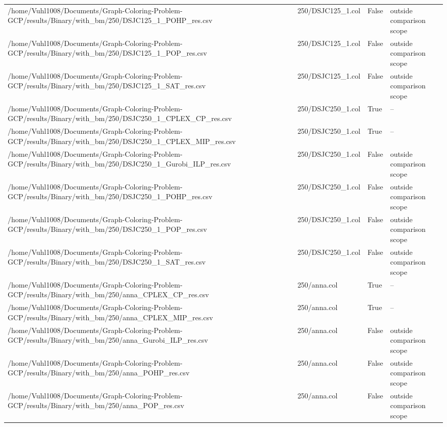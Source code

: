 \begin{table}[htbp]
\begin{tabular}{llll}
/home/Vuhl1008/Documents/Graph-Coloring-Problem-GCP/results/Binary/with\_bm/250/DSJC125\_1\_POHP\_res.csv & 250/DSJC125\_1.col & False & outside comparison scope \\
/home/Vuhl1008/Documents/Graph-Coloring-Problem-GCP/results/Binary/with\_bm/250/DSJC125\_1\_POP\_res.csv & 250/DSJC125\_1.col & False & outside comparison scope \\
/home/Vuhl1008/Documents/Graph-Coloring-Problem-GCP/results/Binary/with\_bm/250/DSJC125\_1\_SAT\_res.csv & 250/DSJC125\_1.col & False & outside comparison scope \\
/home/Vuhl1008/Documents/Graph-Coloring-Problem-GCP/results/Binary/with\_bm/250/DSJC250\_1\_CPLEX\_CP\_res.csv & 250/DSJC250\_1.col & True & -- \\
/home/Vuhl1008/Documents/Graph-Coloring-Problem-GCP/results/Binary/with\_bm/250/DSJC250\_1\_CPLEX\_MIP\_res.csv & 250/DSJC250\_1.col & True & -- \\
/home/Vuhl1008/Documents/Graph-Coloring-Problem-GCP/results/Binary/with\_bm/250/DSJC250\_1\_Gurobi\_ILP\_res.csv & 250/DSJC250\_1.col & False & outside comparison scope \\
/home/Vuhl1008/Documents/Graph-Coloring-Problem-GCP/results/Binary/with\_bm/250/DSJC250\_1\_POHP\_res.csv & 250/DSJC250\_1.col & False & outside comparison scope \\
/home/Vuhl1008/Documents/Graph-Coloring-Problem-GCP/results/Binary/with\_bm/250/DSJC250\_1\_POP\_res.csv & 250/DSJC250\_1.col & False & outside comparison scope \\
/home/Vuhl1008/Documents/Graph-Coloring-Problem-GCP/results/Binary/with\_bm/250/DSJC250\_1\_SAT\_res.csv & 250/DSJC250\_1.col & False & outside comparison scope \\
/home/Vuhl1008/Documents/Graph-Coloring-Problem-GCP/results/Binary/with\_bm/250/anna\_CPLEX\_CP\_res.csv & 250/anna.col & True & -- \\
/home/Vuhl1008/Documents/Graph-Coloring-Problem-GCP/results/Binary/with\_bm/250/anna\_CPLEX\_MIP\_res.csv & 250/anna.col & True & -- \\
/home/Vuhl1008/Documents/Graph-Coloring-Problem-GCP/results/Binary/with\_bm/250/anna\_Gurobi\_ILP\_res.csv & 250/anna.col & False & outside comparison scope \\
/home/Vuhl1008/Documents/Graph-Coloring-Problem-GCP/results/Binary/with\_bm/250/anna\_POHP\_res.csv & 250/anna.col & False & outside comparison scope \\
/home/Vuhl1008/Documents/Graph-Coloring-Problem-GCP/results/Binary/with\_bm/250/anna\_POP\_res.csv & 250/anna.col & False & outside comparison scope \\

\end{tabular}
\end{table}
